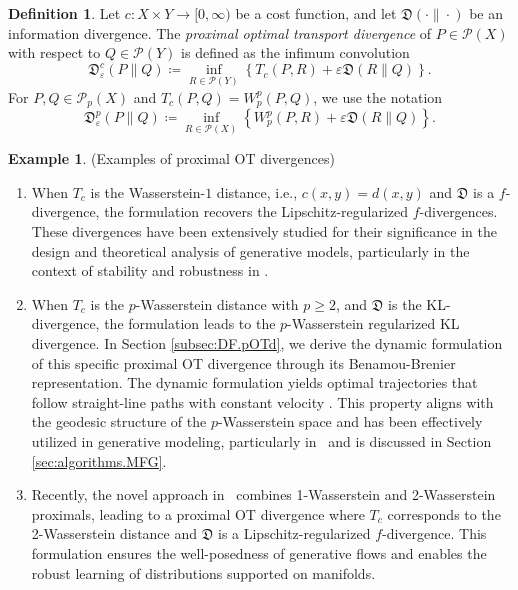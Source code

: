 \documentclass{amsart}
\theoremstyle{definition}
\newtheorem{definition}[theorem]{Definition}
\newtheorem{example}[theorem]{Example}
\theoremstyle{remark}
\numberwithin{equation}{section}
\begin{document}
\begin{definition} 
Let $c:X\times Y \to [0,\infty)$ be a cost function, and let $\mathfrak{D}(\cdot\|\cdot)$ be an information divergence. The \emph{proximal optimal transport divergence} of $P\in \mathcal{P}(X)$ with respect to  $Q\in \mathcal{P}(Y)$ is defined as the infimum convolution 
\begin{equation}\label{eq:def:OTdivergence}
\mathfrak{D}^c_\varepsilon(P\|Q) \coloneqq \inf_{R\in \mathcal{P}(Y)}\left\{ T_c(P,R) + \varepsilon \mathfrak{D}(R\|Q) \right\}.
\end{equation}
For $P,Q\in \mathcal{P}_p(X)$ and $T_c(P,Q)=W_p^p(P,Q)$, we use the notation 
\begin{equation}\label{eq:def:WassersteinOTdivergence}
\mathfrak{D}^{p}_{\varepsilon}(P\|Q) \coloneqq \inf_{R\in\mathcal{P}(X)}
\left\{W_p^p(P,R) + \varepsilon \mathfrak{D}(R\|Q) \right\}.
\end{equation}
\end{definition}
\begin{example}{(Examples of proximal OT divergences)}\label{examples of proximal OT divergences}
\begin{enumerate}
\item When $T_c$ is the Wasserstein-$1$ distance, i.e., $c(x,y) = d(x,y)$ and $\mathfrak{D}$ is a $f$-divergence, the formulation recovers the Lipschitz-regularized $f$-divergences. These divergences have been extensively studied for their significance in the design and theoretical analysis of generative models, particularly in the context of stability and robustness in \cite{birrell2022f,dupuis2022formulation,Gu_GPA, chen2024learning}.
\item When $T_c$ is the $p$-Wasserstein distance with $p\geq 2$, and  $\mathfrak{D}$ is the KL-divergence, the formulation leads to the $p$-Wasserstein regularized KL divergence. In Section \ref{subsec:DF.pOTd}, we derive the dynamic formulation of this specific proximal OT divergence through its Benamou-Brenier representation. The dynamic formulation yields optimal trajectories that follow straight-line paths with constant velocity \cite{finlay2020train}. This property aligns with the geodesic structure of the $p$-Wasserstein space and has been effectively utilized in generative modeling, particularly in~\cite{onken2021ot} and is discussed in Section \ref{sec:algorithms.MFG}.
\item Recently, the novel approach in~\cite{gu2024combining} combines 1-Wasserstein and 2-Wasserstein proximals, leading to a proximal OT divergence where $T_c$ corresponds to the 2-Wasserstein distance and $\mathfrak{D}$ is a Lipschitz-regularized $f$-divergence. This formulation ensures the well-posedness of generative flows and enables the robust learning of distributions supported on manifolds.
\end{enumerate}
\end{example}
\end{document}
